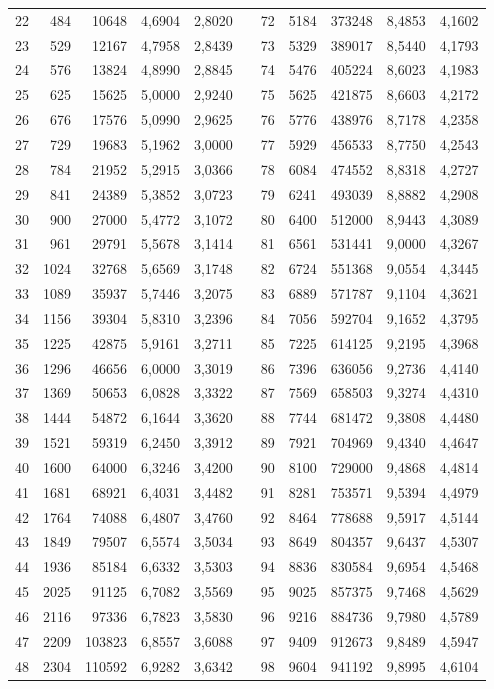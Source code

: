 \begin{longtable}{rrrrrrrrrrr}
22&484&10648&4,6904&2,8020&&72&5184&373248&8,4853&4,1602\\
23&529&12167&4,7958&2,8439&&73&5329&389017&8,5440&4,1793\\
24&576&13824&4,8990&2,8845&&74&5476&405224&8,6023&4,1983\\
25&625&15625&5,0000&2,9240&&75&5625&421875&8,6603&4,2172\\
26&676&17576&5,0990&2,9625&&76&5776&438976&8,7178&4,2358\\
27&729&19683&5,1962&3,0000&&77&5929&456533&8,7750&4,2543\\
28&784&21952&5,2915&3,0366&&78&6084&474552&8,8318&4,2727\\
29&841&24389&5,3852&3,0723&&79&6241&493039&8,8882&4,2908\\
30&900&27000&5,4772&3,1072&&80&6400&512000&8,9443&4,3089\\
31&961&29791&5,5678&3,1414&&81&6561&531441&9,0000&4,3267\\
32&1024&32768&5,6569&3,1748&&82&6724&551368&9,0554&4,3445\\
33&1089&35937&5,7446&3,2075&&83&6889&571787&9,1104&4,3621\\
34&1156&39304&5,8310&3,2396&&84&7056&592704&9,1652&4,3795\\
35&1225&42875&5,9161&3,2711&&85&7225&614125&9,2195&4,3968\\
36&1296&46656&6,0000&3,3019&&86&7396&636056&9,2736&4,4140\\
37&1369&50653&6,0828&3,3322&&87&7569&658503&9,3274&4,4310\\
38&1444&54872&6,1644&3,3620&&88&7744&681472&9,3808&4,4480\\
39&1521&59319&6,2450&3,3912&&89&7921&704969&9,4340&4,4647\\
40&1600&64000&6,3246&3,4200&&90&8100&729000&9,4868&4,4814\\
41&1681&68921&6,4031&3,4482&&91&8281&753571&9,5394&4,4979\\
42&1764&74088&6,4807&3,4760&&92&8464&778688&9,5917&4,5144\\
43&1849&79507&6,5574&3,5034&&93&8649&804357&9,6437&4,5307\\
44&1936&85184&6,6332&3,5303&&94&8836&830584&9,6954&4,5468\\
45&2025&91125&6,7082&3,5569&&95&9025&857375&9,7468&4,5629\\
46&2116&97336&6,7823&3,5830&&96&9216&884736&9,7980&4,5789\\
47&2209&103823&6,8557&3,6088&&97&9409&912673&9,8489&4,5947\\
48&2304&110592&6,9282&3,6342&&98&9604&941192&9,8995&4,6104\\

\end{longtable}
